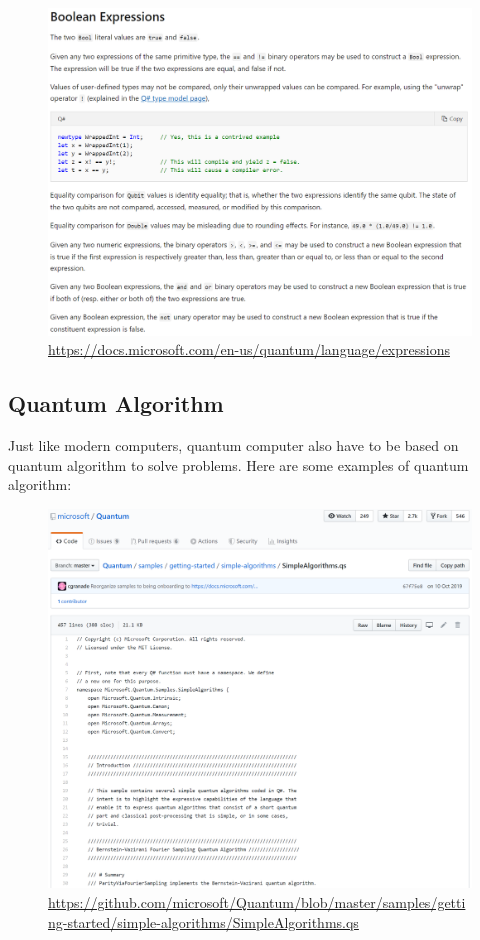 \documentclass{article}
\begin{document}
\begin{figure}[htbp]
\centerline{\includegraphics[width=\textwidth]{3.png}}
\caption{\url{https://docs.microsoft.com/en-us/quantum/language/expressions}}
\label{fig}
\end{figure}
\newpage

\subsection{Quantum Algorithm}
Just like modern computers, quantum computer also have to be based on quantum algorithm to solve problems. Here are some examples of quantum algorithm:


\begin{figure}[htbp]
\centerline{\includegraphics[width=\textwidth]{4.png}}
\caption{\url{https://github.com/microsoft/Quantum/blob/master/samples/getting-started/simple-algorithms/SimpleAlgorithms.qs }}
\label{fig}
\end{figure}
\end{document}
